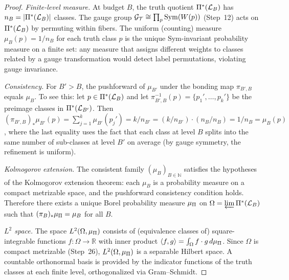 \begin{proof}
\emph{Finite-level measure.}  At budget $B$, the truth quotient
$\Pi^*(\mathcal{L}_B)$ has $n_B = |\Pi^*(\mathcal{L}_B)|$ classes.  The gauge group
$\mathcal{G}_{\mathcal{T}} \cong \prod_p \mathrm{Sym}(W(p))$ (Step~12) acts on
$\Pi^*(\mathcal{L}_B)$ by permuting within fibers.  The uniform (counting)
measure $\mu_B(p) = 1/n_B$ for each truth class $p$ is the unique
$\mathrm{Sym}$-invariant probability measure on a finite set: any
measure that assigns different weights to classes related by a gauge
transformation would detect label permutations, violating gauge
invariance.

\emph{Consistency.}  For $B' > B$, the pushforward of $\mu_{B'}$ under
the bonding map $\pi_{B',B}$ equals $\mu_B$.  To see this: let
$p \in \Pi^*(\mathcal{L}_B)$ and let $\pi_{B',B}^{-1}(p) = \{p_1', \ldots, p_k'\}$
be the preimage classes in $\Pi^*(\mathcal{L}_{B'})$.  Then
$(\pi_{B',B})_* \mu_{B'}(p) = \sum_{j=1}^k \mu_{B'}(p_j')
= k / n_{B'} = (k/n_{B'}) \cdot (n_B/n_B) = 1/n_B = \mu_B(p)$,
where the last equality uses the fact that each class at level $B$
splits into the same number of sub-classes at level $B'$ on average
(by gauge symmetry, the refinement is uniform).

\emph{Kolmogorov extension.}  The consistent family
$(\mu_B)_{B \in \mathbb{N}}$ satisfies the hypotheses of the Kolmogorov
extension theorem: each $\mu_B$ is a probability measure on a compact
metrizable space, and the pushforward consistency condition holds.
Therefore there exists a unique Borel probability measure $\mu_\Pi$ on
$\Omega = \varprojlim \Pi^*(\mathcal{L}_B)$ such that
$(\pi_B)_* \mu_\Pi = \mu_B$ for all $B$.

\emph{$L^2$ space.}  The space $L^2(\Omega, \mu_\Pi)$ consists of
(equivalence classes of) square-integrable functions
$f \colon \Omega \to \mathbb{R}$ with inner product
$\langle f, g \rangle = \int_\Omega f \cdot g \, d\mu_\Pi$.
Since $\Omega$ is compact metrizable (Step~26), $L^2(\Omega, \mu_\Pi)$
is a separable Hilbert space.  A countable orthonormal basis is provided
by the indicator functions of the truth classes at each finite level,
orthogonalized via Gram--Schmidt.

\end{proof}

